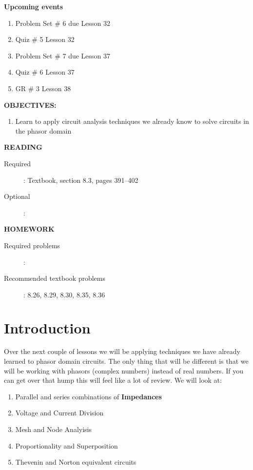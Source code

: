 \documentclass{handout}
\begin{document}
\maketitle

\textbf{Upcoming events}
\begin{enumerate}
\item Problem Set \# 6 due Lesson 32
\item Quiz \# 5 Lesson 32
\item Problem Set \# 7 due Lesson 37
\item Quiz \# 6 Lesson 37
\item GR \# 3 Lesson 38
\end{enumerate}

\textbf{OBJECTIVES:}
\begin{enumerate}
\item Learn to apply circuit analysis techniques we already know to solve circuits in the phasor domain
\end{enumerate}

\textbf{READING}
\begin{description}
\item [Required]:
Textbook, section 8.3, pages 391--402
\item [Optional]: 
\end{description}

\textbf{HOMEWORK}
\begin{description}
\item [Required problems]: 
\item [Recommended textbook problems]: 8.26, 8.29, 8.30, 8.35, 8.36
\end{description}

\section{Introduction}
Over the next couple of lessons we will be applying techniques we have already learned to phasor domain circuits.  The only thing that will be different is that we will be working with phasors (complex numbers) instead of real numbers.  If you can get over that hump this will feel like a lot of review.  We will look at:
\begin{enumerate}
\item Parallel and series combinations of \textbf{Impedances}
\item Voltage and Current Division
\item Mesh and Node Analyisis
\item Proportionality and Superposition
\item Thevenin and Norton equivalent circuits
\end{enumerate}
\end{document}
